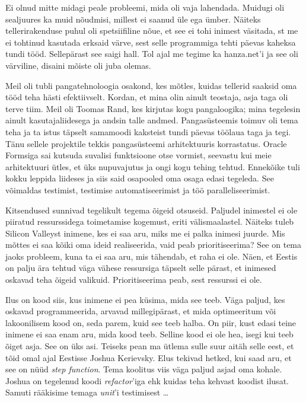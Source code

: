 Ei olnud mitte midagi peale probleemi, mida oli vaja 
lahendada. Muidugi oli sealjuures ka muid nõudmisi, millest ei 
saanud üle ega ümber. Näiteks tellerirakenduse puhul oli spetsiifiline nõue, et see ei tohi inimest väsitada, st me
ei tohtinud kasutada erksaid värve, sest selle programmiga tehti päevas kaheksa tundi 
tööd. Sellepärast see saigi hall. Tol ajal me tegime ka hanza.net'i 
ja see oli värviline, disaini mõiste oli juba olemas.


Meil oli tubli pangatehnoloogia osakond, kes mõtles, kuidas tellerid saaksid oma tööd teha
hästi efektiivselt. Kordan, et mina olin ainult 
teostaja, asja taga oli terve tiim. Meil oli Toomas Rand, kes kirjutas kogu pangaloogika; mina tegelesin 
ainult kasutajaliidesega ja andsin talle andmed. Pangasüsteemis 
toimuv oli tema teha ja ta istus täpselt samamoodi kaksteist tundi päevas töölaua taga ja 
tegi. Tänu sellele projektile tekkis pangasüsteemi arhitektuuris 
korrastatus. Oracle Formsiga sai kutsuda suvalisi funktsioone otse vormist, seevastu kui 
meie arhitektuuri ütles, et üks nupuvajutus ja ongi kogu tehing tehtud. Ennekõike tuli kokku leppida liideses 
ja siis said osapooled oma osaga edasi tegeleda. See 
võimaldas testimist, testimise automatiseerimist ja töö paralleliseerimist. 

Kitsendused sunnivad tegelikult tegema õigeid otsuseid. Paljudel inimestel ei ole piiratud  
ressurssidega toimetamise kogemust, eriti välismaalastel. Näiteks tuleb Silicon Valleyst inimene, kes ei saa aru, miks
me ei palka inimesi juurde. Mis mõttes ei saa kõiki oma ideid realiseerida, vaid
peab prioritiseerima? See on tema jaoks probleem, kuna ta ei saa 
aru, mis tähendab, et raha ei ole. Näen, et Eestis 
on palju ära tehtud väga vähese ressursiga täpselt selle pärast, 
et inimesed oskavad teha õigeid valikuid. Prioritiseerima peab, sest ressurssi ei 
ole.


Ilus on kood siis, kus inimene ei pea küsima, mida see teeb. Väga 
paljud, kes oskavad programmeerida, arvavad millegipärast, et mida 
optimeeritum või lakoonilisem kood on, seda parem, kuid see teeb halba. On piir, kust
edasi teine inimene ei saa enam aru, mida kood teeb. Selline kood ei ole hea, isegi kui teeb õiget asja. See on üks asi. Teiseks pean ma 
ütlema sulle suur aitäh selle eest, et tõid omal ajal Eestisse Joshua 
Kerievsky. Elus tekivad hetked, kui saad aru, 
et see on nüüd \emph{step function}. Tema koolitus viis
väga paljud asjad oma kohale. Joshua on tegelenud koodi \emph{refactor}'iga ehk kuidas teha kehvast koodist ilusat. Samuti rääkisime temaga \emph{unit}'i 
testimisest \ldots

